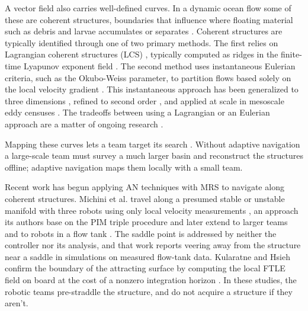 \documentclass[lettersize,journal]{IEEEtran}
\begin{document}
A vector field also carries well-defined curves. In a dynamic ocean flow some of these are coherent structures, boundaries that influence where floating material such as debris and larvae accumulates or separates \cite{11,12}.
Coherent structures are typically identified through one of two primary methods.
The first relies on Lagrangian coherent structures (LCS) \cite{16}, typically computed as ridges in the finite-time Lyapunov exponent field \cite{17}. 
The second method uses instantaneous Eulerian criteria, such as the Okubo-Weiss parameter, to partition flows based solely on the local velocity gradient \cite{8,22}.
This instantaneous approach has been generalized to three dimensions \cite{23}, refined to second order \cite{24}, and applied at scale in mesoscale eddy censuses \cite{25}. 
The tradeoffs between using a Lagrangian or an Eulerian approach are a matter of ongoing research \cite{18,19,20,21}.


Mapping these curves lets a team target its search \cite{12,13,14,15}. Without adaptive navigation a large-scale team must survey a much larger basin and reconstruct the structures offline; adaptive navigation maps them locally with a small team.


Recent work has begun applying AN techniques with MRS to navigate along coherent structures.
 Michini et al. travel along a presumed stable or
unstable manifold with three robots using only local velocity
measurements \cite{26}, an approach its authors base on the PIM triple
procedure and later extend to larger teams \cite{27} and to robots in a
flow tank \cite{28}. The saddle point is addressed by neither the
controller nor its analysis, and that work reports veering away from
the structure near a saddle in simulations on measured flow-tank data.
 Kularatne and Hsieh confirm the boundary of the attracting surface by computing the local FTLE field on board at the cost of a nonzero integration horizon \cite{29}.
In these studies, the robotic teams pre-straddle the structure, and do not acquire a structure if they aren't.
\end{document}
